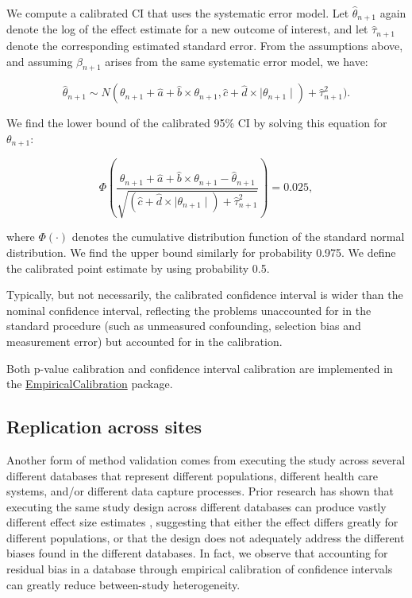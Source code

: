 \documentclass[]{book}
\begin{document}
We compute a calibrated CI that uses the systematic error model. Let
\(\hat{\theta}_{n+1}\) again denote the log of the effect estimate for a
new outcome of interest, and let \(\hat{\tau}_{n+1}\) denote the
corresponding estimated standard error. From the assumptions above, and
assuming \(\beta_{n+1}\) arises from the same systematic error model, we
have:

\[\hat{\theta}_{n+1} \sim N(
\theta_{n+1} + \hat{a} + \hat{b} \times \theta_{n+1},
\hat{c} + \hat{d} \times \mid \theta_{n+1} \mid) + \hat{\tau}_{n+1}^2) .\]

We find the lower bound of the calibrated 95\% CI by solving this
equation for \(\theta_{n+1}\):

\[\Phi\left(
\frac{\theta_{n+1} + \hat{a} + \hat{b} \times \theta_{n+1}-\hat{\theta}_{n+1}}
{\sqrt{(\hat{c} + \hat{d} \times \mid \theta_{n+1} \mid) + \hat{\tau}_{n+1}^2}}
\right) = 0.025 ,\]

where \(\Phi(\cdot)\) denotes the cumulative distribution function of
the standard normal distribution. We find the upper bound similarly for
probability 0.975. We define the calibrated point estimate by using
probability 0.5.

Typically, but not necessarily, the calibrated confidence interval is
wider than the nominal confidence interval, reflecting the problems
unaccounted for in the standard procedure (such as unmeasured
confounding, selection bias and measurement error) but accounted for in
the calibration.

Both p-value calibration and confidence interval calibration are
implemented in the
\href{https://ohdsi.github.io/EmpiricalCalibration/}{EmpiricalCalibration}
package.

\subsection{Replication across sites}\label{replication-across-sites}

Another form of method validation comes from executing the study across
several different databases that represent different populations,
different health care systems, and/or different data capture processes.
Prior research has shown that executing the same study design across
different databases can produce vastly different effect size estimates
\citep{madigan_2013}, suggesting that either the effect differs greatly
for different populations, or that the design does not adequately
address the different biases found in the different databases. In fact,
we observe that accounting for residual bias in a database through
empirical calibration of confidence intervals can greatly reduce
between-study heterogeneity. \citep{schuemie_2018}
\end{document}
